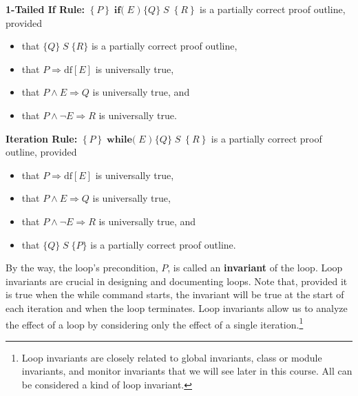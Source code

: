 \documentclass[11pt]{article}%
\begin{document}
\textbf{1-Tailed If Rule:} $\left\{  P\right\}  \;\mathbf{if(}%
\;E\;)\;\{Q\}\;S\;\left\{  R\right\}  $ is a partially correct proof outline, provided

\begin{itemize}
\item that $\{Q\}\;S\;\{R\}$ is a partially correct proof outline,

\item that $P\Rightarrow\mathrm{df}[E]$ is universally true,

\item that $P\wedge E\Rightarrow Q$ is universally true, and

\item that $P\wedge\lnot E\Rightarrow R$ is universally true.
\end{itemize}

\textbf{Iteration Rule:} $\left\{  P\right\}  \;\mathbf{while(}%
\;E\;)\;\{Q\}\;S\;\left\{  R\right\}  $ is a partially correct proof outline, provided

\begin{itemize}
\item that $P\Rightarrow\mathrm{df}[E]$ is universally true,

\item that $P\wedge E\Rightarrow Q$ is universally true,

\item that $P\wedge\lnot E\Rightarrow R$ is universally true, and

\item that $\{Q\}\;S\;\{P\}$ is a partially correct proof outline.
\end{itemize}

By the way, the loop's precondition, $P$, is called an \textbf{invariant} of
the loop. Loop invariants are crucial in designing and documenting loops. Note
that, provided it is true when the while command starts, the invariant will be
true at the start of each iteration and when the loop terminates. Loop
invariants allow us to analyze the effect of a loop by considering only the
effect of a single iteration.\footnote{Loop invariants are closely related to
global invariants, class or module invariants, and monitor invariants that we
will see later in this course. All can be considered a kind of loop
invariant.}
\end{document}
